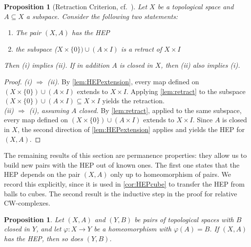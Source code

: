 \documentclass[11pt, a4paper, english]{article}
\theoremstyle{plain}
\newtheorem{proposition}[theorem]{Proposition}
\theoremstyle{definition}
\theoremstyle{remark}
\numberwithin{equation}{section}
\numberwithin{theorem}{section}
\begin{document}
\begin{proposition}[Retraction Criterion, cf.\ {\cite[(5.1.2 Proposition)]{Tammo}}]  \label{prop:retractioncriterion}
    Let $X$ be a topological space and $A \subseteq X$ a subspace. Consider the following two statements:
    \begin{enumerate}
    \renewcommand{\labelenumi}{(\roman{enumi})}
        \item The pair $(X,A)$ has the \emph{HEP}
        \item the subspace ($X \times \{ 0\}) \cup (A \times I)$ is a retract of $X \times I$
    \end{enumerate}
    Then (i) implies (ii). If in addition $A$ is closed in $X$, then (ii) also implies (i).
\end{proposition}

\begin{proof}
    \emph{(i) $\Rightarrow$ (ii).} 
    By \cref{lem:HEPextension}, every map defined on  $(X \times \{0\}) \cup (A \times I)$ extends to $X \times I$. Applying \cref{lem:retract} to the subspace $(X \times \{0\}) \cup (A \times I) \subseteq X \times I$ yields the retraction. \\
    \emph{(ii) $\Rightarrow$ (i), assuming $A$ closed.} By \cref{lem:retract}, applied to the same subspace, every map defined on $(X \times \{0\}) \cup (A \times I)$ extends to $X \times I$. Since $A$ is closed in $X$, the second direction of \cref{lem:HEPextension} applies and yields the HEP for $(X,A)$.
\end{proof}

The remaining results of this section are permanence properties: they allow us to build new pairs with the HEP out of known ones. The first one states that the HEP depends on the pair $(X,A)$ only up to homeomorphism of pairs. We record this explicitly, since it is used in \cref{cor:HEPcube} to transfer the HEP from balls to cubes. The second result is the inductive step in the proof for relative CW-complexes.

\begin{proposition} \label{prop:HEPhomeo}
    Let $(X,A)$ and $(Y,B)$ be pairs of topological spaces with $B$ closed in $Y$, and let $\varphi \colon X \to Y$ be a homeomorphism with $\varphi(A) = B$. If $(X,A)$ has the HEP, then so does $(Y,B)$.
\end{proposition}
\end{document}
